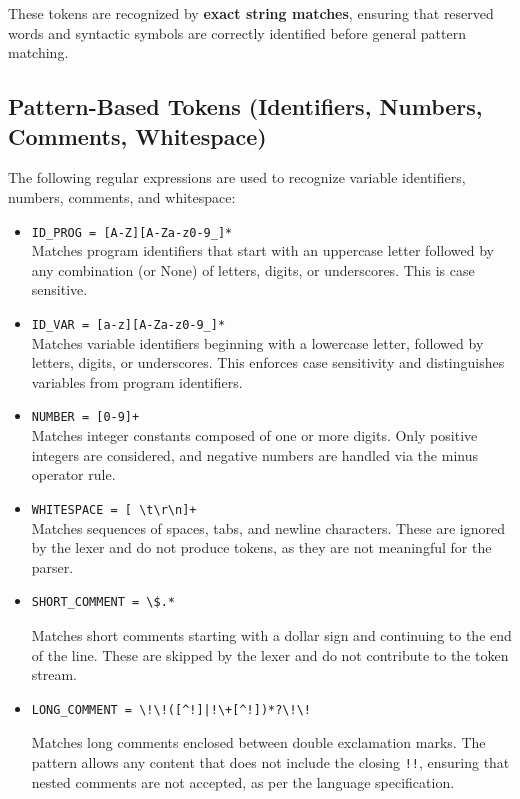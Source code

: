 \documentclass{article}
\begin{document}
\noindent These tokens are recognized by \textbf{exact string matches}, ensuring that reserved words and syntactic symbols are correctly identified before general pattern matching.


\subsection{Pattern-Based Tokens (Identifiers, Numbers, Comments, Whitespace)}

\noindent The following regular expressions are used to recognize variable identifiers, numbers, comments, and whitespace:

\begin{itemize}

    \item \texttt{ID\_PROG = [A-Z][A-Za-z0-9\_]*} \\
    Matches program identifiers that start with an uppercase letter followed by any combination (or None) of letters, digits, or underscores. This is case sensitive.
    
    \item \texttt{ID\_VAR = [a-z][A-Za-z0-9\_]*} \\  
    Matches variable identifiers beginning with a lowercase letter, followed by letters, digits, or underscores. This enforces case sensitivity and distinguishes variables from program identifiers.
    
    \item \texttt{NUMBER = [0-9]+} \\  
    Matches integer constants composed of one or more digits. Only positive integers are considered, and negative numbers are handled via the minus operator rule.
    
    \item \texttt{WHITESPACE = [ \textbackslash t\textbackslash r\textbackslash n]+} \\  
    Matches sequences of spaces, tabs, and newline characters. These are ignored by the lexer and do not produce tokens, as they are not meaningful for the parser.
    
    \item \begin{verbatim}SHORT_COMMENT = \$.* \end{verbatim} 
    Matches short comments starting with a dollar sign and continuing to the end of the line. These are skipped by the lexer and do not contribute to the token stream.
    
    \item \begin{verbatim}LONG_COMMENT = \!\!([^!]|!\+[^!])*?\!\! \end{verbatim}
    Matches long comments enclosed between double exclamation marks. The pattern allows any content that does not include the closing \texttt{!!}, ensuring that nested comments are not accepted, as per the language specification.
    
\end{itemize}
\end{document}
